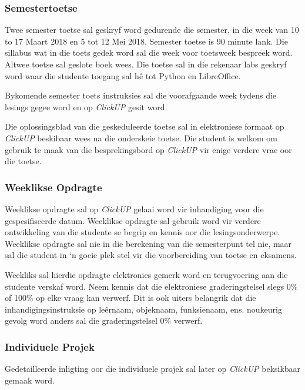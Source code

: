     \subsubsection{Semestertoetse}
        Twee semester toetse sal geskryf word gedurende die semester, in die
        week van 10 to 17 Maart 2018 en 5 tot 12 Mei 2018. Semester
        toetse is 90 minute lank. Die sillabus wat in die toets gedek word sal
        die week voor toetsweek bespreek word. Altwee toetse sal geslote boek
        wees. Die toetse sal in die rekenaar labs geskryf word waar die
        studente toegang sal h\^{e} tot Python en LibreOffice.

        Bykomende semester toets instruksies sal die voorafgaande week tydens
        die lesings gegee word en op \textit{ClickUP} gesit word.

        Die oplossingsblad van die geskeduleerde toetse sal in elektroniese
        formaat op \textit{ClickUP} beskibaar wees na die onderskeie toetse.
        Die student is welkom om gebruik te maak van die besprekingsbord op
        \textit{ClickUP} vir enige verdere vrae oor die toetse.

    \subsubsection{Weeklikse Opdragte} \label{sec:tutoriaal}
        Weeklikse opdragte sal op \textit{ClickUP} gelaai word vir inhandiging
        voor die gespesifiseerde datum. Weeklikse opdragte sal gebruik word vir
        verdere ontwikkeling van die studente se begrip en kennis oor die
        lesingsonderwerpe. Weeklikse opdragte sal nie in die berekening van die
        semesterpunt tel nie, maar sal die student in `n goeie plek stel vir
        die voorbereiding van toetse en eksamens.

        Weekliks sal hierdie opdragte elektronies gemerk word en terugvoering
        aan die studente verskaf word. Neem kennis dat die elektroniese
        graderingstelsel slegs 0\% of 100\% op elke vraag kan verwerf. Dit is
        ook uiters belangrik dat die inhandigingsinstruksie op le\^ernaam,
        objeknaam, funksienaam, ens. noukeurig gevolg word anders sal die
        graderingstelsel 0\% verwerf.

    \subsubsection{Individuele Projek}
        Gedetailleerde inligting oor die individuele projek sal later op
        \textit{ClickUP} beksikbaar gemaak word.

